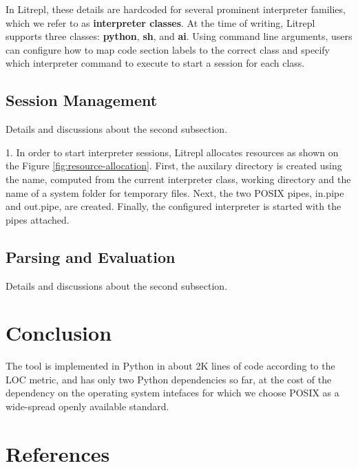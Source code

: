 \documentclass[a4paper,12pt,twocolumn]{article}
\begin{document}
In Litrepl, these details are hardcoded for several prominent interpreter
families, which we refer to as \textbf{interpreter classes}. At the time of
writing, Litrepl supports three classes: \textbf{python}, \textbf{sh}, and
\textbf{ai}. Using command line arguments, users can configure how to map code
section labels to the correct class and specify which interpreter command to
execute to start a session for each class.

\subsection{Session Management}

Details and discussions about the second subsection.

1. In order to start interpreter sessions, Litrepl allocates resources as shown
on the Figure \ref{fig:resource-allocation}. First, the auxilary directory is
created using the name, computed from the current interpreter class, working
directory and the name of a system folder for temporary files.  Next, the two
POSIX pipes, in.pipe and out.pipe, are created. Finally, the configured
interpreter is started with the pipes attached.

\subsection{Parsing and Evaluation}

Details and discussions about the second subsection.

\section{Conclusion}

The tool is implemented in Python in about 2K lines of code according to the LOC
metric, and has only two Python dependencies so far, at the cost of the
dependency on the operating system intefaces for which we choose POSIX as a
wide-spread openly available standard.

\section*{References}
\printbibliography
\end{document}

